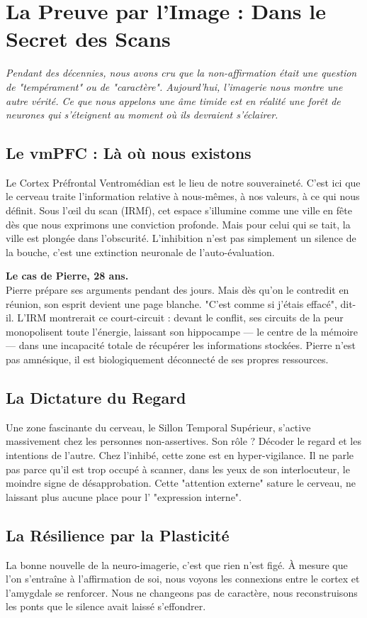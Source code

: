\chapter{La Preuve par l'Image : Dans le Secret des Scans}

\textit{Pendant des décennies, nous avons cru que la non-affirmation était une question de "tempérament" ou de "caractère". Aujourd'hui, l'imagerie nous montre une autre vérité. Ce que nous appelons une âme timide est en réalité une forêt de neurones qui s'éteignent au moment où ils devraient s'éclairer.}

\section{Le vmPFC : Là où nous existons}
Le Cortex Préfrontal Ventromédian est le lieu de notre souveraineté. C'est ici que le cerveau traite l'information relative à nous-mêmes, à nos valeurs, à ce qui nous définit. Sous l'œil du scan (IRMf), cet espace s'illumine comme une ville en fête dès que nous exprimons une conviction profonde. Mais pour celui qui se tait, la ville est plongée dans l'obscurité. L'inhibition n'est pas simplement un silence de la bouche, c'est une extinction neuronale de l'auto-évaluation.

\begin{NoteClinique}
\textbf{Le cas de Pierre, 28 ans.} \\
Pierre prépare ses arguments pendant des jours. Mais dès qu'on le contredit en réunion, son esprit devient une page blanche. "C'est comme si j'étais effacé", dit-il. L'IRM montrerait ce court-circuit : devant le conflit, ses circuits de la peur monopolisent toute l'énergie, laissant son hippocampe — le centre de la mémoire — dans une incapacité totale de récupérer les informations stockées. Pierre n'est pas amnésique, il est biologiquement déconnecté de ses propres ressources.
\end{NoteClinique}

\section{La Dictature du Regard}
Une zone fascinante du cerveau, le Sillon Temporal Supérieur, s'active massivement chez les personnes non-assertives. Son rôle ? Décoder le regard et les intentions de l'autre. Chez l'inhibé, cette zone est en hyper-vigilance. Il ne parle pas parce qu'il est trop occupé à scanner, dans les yeux de son interlocuteur, le moindre signe de désapprobation. Cette "attention externe" sature le cerveau, ne laissant plus aucune place pour l' "expression interne".

\section{La Résilience par la Plasticité}
La bonne nouvelle de la neuro-imagerie, c'est que rien n'est figé. À mesure que l'on s'entraîne à l'affirmation de soi, nous voyons les connexions entre le cortex et l'amygdale se renforcer. Nous ne changeons pas de caractère, nous reconstruisons les ponts que le silence avait laissé s'effondrer.
